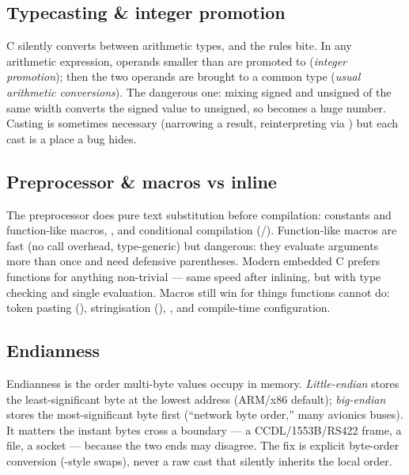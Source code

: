 \subsection{Typecasting \& integer promotion}

C silently converts between arithmetic types, and the rules bite. In any
arithmetic expression, operands smaller than  are promoted to
 (\emph{integer promotion}); then the two operands are brought to a
common type (\emph{usual arithmetic conversions}). The dangerous one: mixing
signed and unsigned of the same width converts the signed value to unsigned,
so  becomes a huge number. Casting is sometimes necessary (narrowing
a result, reinterpreting via ) but each cast is a place a bug
hides.

\subsection{Preprocessor \& macros vs inline}

The preprocessor does pure text substitution before compilation: 
constants and function-like macros, , and conditional
compilation (/). Function-like macros are fast (no
call overhead, type-generic) but dangerous: they evaluate arguments more than
once and need defensive parentheses. Modern embedded C prefers  functions for anything non-trivial --- same speed after inlining, but
with type checking and single evaluation. Macros still win for things
functions cannot do: token pasting (\code{\#\#}), stringisation (\code{\#}),
, and compile-time configuration.

\subsection{Endianness}

Endianness is the order multi-byte values occupy in memory.
\emph{Little-endian} stores the least-significant byte at the lowest address
(ARM/x86 default); \emph{big-endian} stores the most-significant byte first
(``network byte order,'' many avionics buses). It matters the instant bytes
cross a boundary --- a CCDL/1553B/RS422 frame, a file, a socket --- because
the two ends may disagree. The fix is explicit byte-order conversion
(-style swaps), never a raw cast that silently inherits the local
order.

